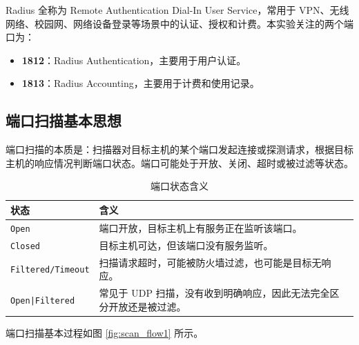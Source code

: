 \documentclass[UTF8,a4paper,12pt]{ctexart}
\begin{document}
Radius 全称为 Remote Authentication Dial-In User Service，常用于 VPN、无线网络、校园网、网络设备登录等场景中的认证、授权和计费。本实验关注的两个端口为：

\begin{itemize}[itemsep=2pt]
    \item \textbf{1812}：Radius Authentication，主要用于用户认证。
    \item \textbf{1813}：Radius Accounting，主要用于计费和使用记录。
\end{itemize}

\subsection{端口扫描基本思想}

端口扫描的本质是：扫描器对目标主机的某个端口发起连接或探测请求，根据目标主机的响应情况判断端口状态。端口可能处于开放、关闭、超时或被过滤等状态。

\begin{table}[H]
\centering
\caption{端口状态含义}
\label{tab:status}
\begin{tabularx}{0.92\textwidth}{C{3cm}Y}
\toprule
状态 & 含义 \\
\midrule
\texttt{Open} & 端口开放，目标主机上有服务正在监听该端口。 \\
\texttt{Closed} & 目标主机可达，但该端口没有服务监听。 \\
\texttt{Filtered/Timeout} & 扫描请求超时，可能被防火墙过滤，也可能是目标无响应。 \\
\texttt{Open|Filtered} & 常见于 UDP 扫描，没有收到明确响应，因此无法完全区分开放还是被过滤。 \\
\bottomrule
\end{tabularx}
\end{table}

端口扫描基本过程如图 \ref{fig:scan_flow1} 所示。
\end{document}
